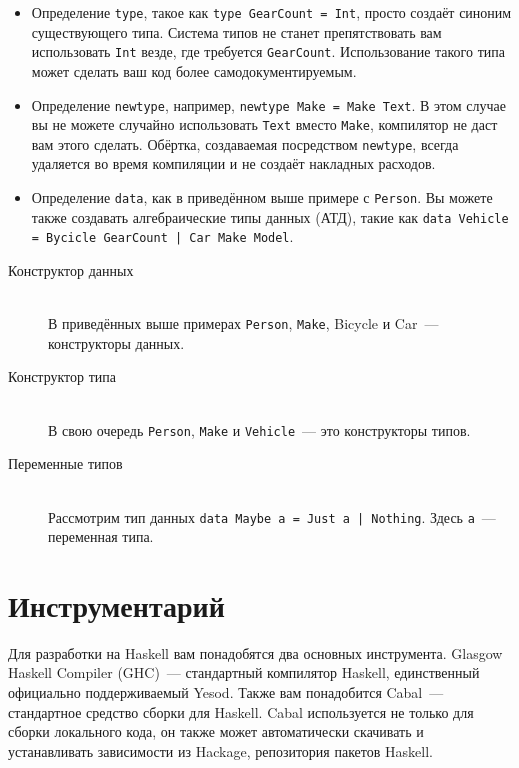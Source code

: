 \begin{itemize}
  \item Определение \lstinline'type', такое как \lstinline'type GearCount = Int',
      просто создаёт синоним существующего типа. Система типов не станет
      препятствовать вам использовать \lstinline'Int' везде, где требуется
      \lstinline'GearCount'. Использование такого типа может сделать ваш код
      более самодокументируемым.
  \item Определение \lstinline'newtype', например, \lstinline'newtype Make = Make Text'.
      В этом случае вы не можете случайно использовать \lstinline'Text' вместо
      \lstinline'Make', компилятор не даст вам этого сделать. Обёртка,
      создаваемая посредством \lstinline'newtype', всегда удаляется во время
      компиляции и не создаёт накладных расходов.
  \item Определение \lstinline'data', как в приведённом выше примере с
      \lstinline'Person'. Вы можете также создавать алгебраические типы данных
      (АТД), такие как \lstinline'data Vehicle = Bycicle GearCount | Car Make Model'.
\end{itemize}

\begin{description}
\item[Конструктор данных] \hfill \\
В приведённых выше примерах \lstinline'Person', \lstinline'Make', Bicycle и
Car~--- конструкторы данных.

\item[Конструктор типа] \hfil \\
В свою очередь \lstinline'Person', \lstinline'Make' и \lstinline'Vehicle'~---
это конструкторы типов.

\item[Переменные типов] \hfill \\
Рассмотрим тип данных \lstinline'data Maybe a = Just a | Nothing'. Здесь
\lstinline'a'~--- переменная типа.
\end{description}

\section{Инструментарий}

Для разработки на Haskell вам понадобятся два основных инструмента. Glasgow
Haskell Compiler (GHC)~--- стандартный компилятор Haskell, единственный
официально поддерживаемый Yesod. Также вам понадобится Cabal~--- стандартное
средство сборки для Haskell. Cabal используется не только для сборки локального
кода, он также может автоматически скачивать и устанавливать зависимости из
Hackage, репозитория пакетов Haskell.

